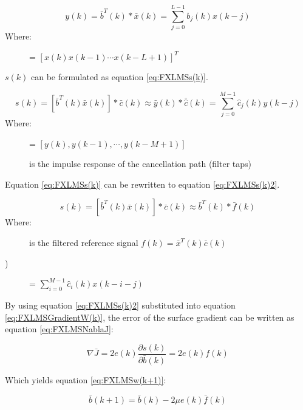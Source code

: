 \begin{equation}\label{eq:FXLMSOutput}
y(k) = \bar{b}^T(k)*\bar{x}(k) = \sum_{j=0}^{L-1} b_j(k)x(k-j)
\end{equation}
Where:
\begin{description}
	\item[] = $[x(k) x(k-1) \cdots x(k-L+1)]^T $
\end{description}
$s(k)$ can be formulated as equation \ref{eq:FXLMSs(k)}.

\begin{equation}\label{eq:FXLMSs(k)}
s(k) = [\bar{b}^T(k)\bar{x}(k)]*\bar{c}(k)\approx \bar{y}(k)*\bar{\hat{c}}(k) = \sum_{j=0}^{M-1}\hat{c}_j(k)y(k-j)
\end{equation}
Where:
\begin{description}
	\item[] = $[ y(k), y(k-1), \cdots, y(k-M+1)]$
	\item[] is the impulse response of the cancellation path (filter taps)
\end{description}

Equation \ref{eq:FXLMSs(k)} can be rewritten to equation \ref{eq:FXLMSs(k)2}.

\begin{equation}\label{eq:FXLMSs(k)2}
s(k) = [\bar{b}^T(k)\bar{x}(k)]*\bar{c}(k)\approx \bar{b}^T(k)*\bar{f}(k)
\end{equation}
Where:
\begin{description}
	\item[] is the filtered reference signal $f(k)=\bar{x}^T(k)\bar{c}(k)$
	\item[)] = $\sum_{i=0}^{M-1}\hat{c}_i(k)x(k-i-j)$
\end{description}

By using equation \ref{eq:FXLMSs(k)2} substituted into equation \ref{eq:FXLMSGradientW(k)}, the error of the surface gradient can be written as equation \ref{eq:FXLMSNablaJ}:

\begin{equation}\label{eq:FXLMSNablaJ}
\nabla \bar{J} = 2e(k)\frac{\partial s(k)}{\partial \bar{b}(k)} = 2e(k)f(k)
\end{equation}

Which yields equation \ref{eq:FXLMSw(k+1)}:

\begin{equation}\label{eq:FXLMSw(k+1)}
\bar{b}(k+1) = \bar{b}(k) - 2\mu e(k)\bar{f}(k)
\end{equation}

